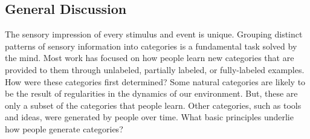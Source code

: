 \documentclass[12pt]{article}
\begin{document}
\begin{flushleft}


\section{General Discussion}
The sensory impression of every stimulus and event is unique. Grouping distinct
patterns of sensory information into categories is a fundamental task solved by
the mind. Most work has focused on how people learn new categories that are
provided to them through unlabeled, partially labeled, or fully-labeled
examples. How were these categories first determined? Some natural categories
are likely to be the result of regularities in the dynamics of our environment.
But, these are only a subset of the categories that people learn. Other
categories, such as tools and ideas, were generated by people over time. What
basic principles underlie how people generate categories?



\end{flushleft}
\end{document}
